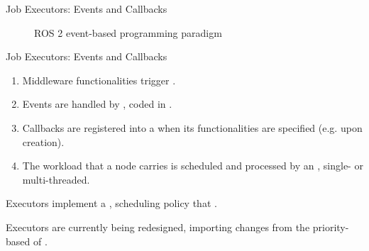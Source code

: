 \begin{frame}{Job Executors: Events and Callbacks}
	\begin{figure}
		\centering
		
		\label{fig:executorscheme}
		\caption{ROS 2 event-based programming paradigm}
	\end{figure}
\end{frame}
\begin{frame}{Job Executors: Events and Callbacks}
	\begin{enumerate}
		\item Middleware functionalities trigger .
		\item Events are handled by , coded in .
		\item Callbacks are registered into a  when its functionalities are specified (e.g. upon creation).
		\item The workload that a node carries is scheduled and processed by an , single- or multi-threaded.
	\end{enumerate}
	\begin{alertblock}{}
		Executors implement a ,  scheduling policy that .
	\end{alertblock}
	Executors are currently being redesigned, importing changes from the priority-based  of .
\end{frame}
